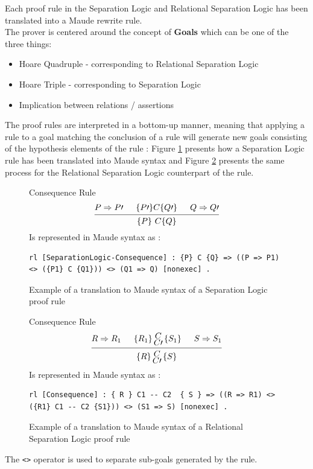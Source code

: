 \documentclass[12pt,a4paper]{article}
\newcommand{\hq}[4]{
	\left\{{#1}\right\}
	\let\scriptstyle\textstyle 
	\substack{{#2} \\ 	\let\scriptstyle\textstyle {#3}} 
	\left\{{#4}\right\}
}
\begin{document}
Each proof rule in the Separation Logic and Relational Separation Logic has been translated into a Maude rewrite rule. 
\\
The prover is centered around the concept of \textbf{Goals} which can be one of the three things: 
\begin{itemize}
	\item {Hoare Quadruple} - corresponding to Relational Separation Logic
	\item {Hoare Triple} - corresponding to Separation Logic
	\item {Implication between relations / assertions} 
\end{itemize} 
The proof rules are interpreted in a bottom-up manner, meaning that applying a rule to a goal matching the conclusion of a rule will generate new goals consisting of the hypothesis elements of the rule : Figure \ref{fig:SLTranslation} presents how a Separation Logic rule has been translated into Maude syntax and Figure \ref{fig:RSLTranslation} presents the same process for the Relational Separation Logic counterpart of the rule.
\begin{figure}[h]
	Consequence Rule
	\medskip
	\[
	\begin{prooftree}
	\Hypo{P \Rightarrow P\prime}
	\Hypo{\{P\prime\} C \{Q\prime\}}
	\Hypo{Q \Rightarrow Q\prime}
	\Infer 3 {\{P\}\  C  \{Q\}}
	\end{prooftree}	
	\]
	Is represented in Maude syntax as : 
\begin{lstlisting}[caption=Separation Logic Consequence rule]
	rl [SeparationLogic-Consequence] : {P} C {Q} => ((P => P1) <> ({P1} C {Q1})) <> (Q1 => Q) [nonexec] .
\end{lstlisting}
	\caption{Example of a translation to Maude syntax of a Separation Logic proof rule}
	\label{fig:SLTranslation}
\end{figure}

\begin{figure}[h]
	Consequence Rule
	\[
	\begin{prooftree}
	\Hypo{R \Rightarrow R_1}
	\Hypo{\hq{R_1}{C}{C\prime}{S_1}}
	\Hypo{S \Rightarrow S_1}
	\Infer 3 {\hq{R}{C}{C\prime}{S}}
	\end{prooftree}	
	\]
	Is represented in Maude syntax as : 
	\begin{lstlisting}[caption=Relational Separation Logic Consequence rule]
	rl [Consequence] : { R } C1 -- C2  { S } => ((R => R1) <> ({R1} C1 -- C2 {S1})) <> (S1 => S) [nonexec] .
	\end{lstlisting}
	\caption{Example of a translation to Maude syntax of a Relational Separation Logic proof rule}
	\label{fig:RSLTranslation}
\end{figure}
The \texttt{<>} operator is used to separate sub-goals generated by the rule.
\\
\end{document}
